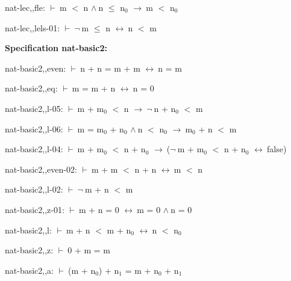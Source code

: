 \documentclass[a4paper]{article}
\newcommand{\Fol}{\mbox{$\vdash\ $}}
\newcommand{\Not}{\mbox{$\neg\ $}}
\newcommand{\And}{\mbox{$\wedge\ $}}
\newcommand{\Imp}{\mbox{$\rightarrow\ $}}
\newcommand{\Equiv}{\mbox{$\leftrightarrow\ $}}
\begin{document}
nat-lec,,fle: 
 \Fol m $<$ n \And n $\le$ $\mbox{n}_{0}$ \Imp m $<$ $\mbox{n}_{0}$



\bigskip

nat-lec,,lels-01: 
 \Fol \Not m $\le$ n \Equiv n $<$ m



\bigskip

{\bf Specification nat-basic2:}

nat-basic2,,even: 
 \Fol n + n = m + m \Equiv n = m



\bigskip

nat-basic2,,eq: 
 \Fol m = m + n \Equiv n = 0



\bigskip

nat-basic2,,l-05: 
 \Fol m + $\mbox{m}_{0}$ $<$ n \Imp \Not n + $\mbox{n}_{0}$ $<$ m



\bigskip

nat-basic2,,l-06: 
 \Fol m = $\mbox{m}_{0}$ + $\mbox{n}_{0}$ \And n $<$ $\mbox{n}_{0}$ \Imp $\mbox{m}_{0}$ + n $<$ m



\bigskip

nat-basic2,,l-04: 
 \Fol m + $\mbox{m}_{0}$ $<$ n + $\mbox{n}_{0}$ \Imp (\Not m + $\mbox{m}_{0}$ $<$ n + $\mbox{n}_{0}$ \Equiv false)



\bigskip

nat-basic2,,even-02: 
 \Fol m + m $<$ n + n \Equiv m $<$ n



\bigskip

nat-basic2,,l-02: 
 \Fol \Not m + n $<$ m



\bigskip

nat-basic2,,z-01: 
 \Fol m + n = 0 \Equiv m = 0 \And n = 0



\bigskip

nat-basic2,,l: 
 \Fol m + n $<$ m + $\mbox{n}_{0}$ \Equiv n $<$ $\mbox{n}_{0}$



\bigskip

nat-basic2,,z: 
 \Fol 0 + m = m



\bigskip

nat-basic2,,a: 
 \Fol (m + $\mbox{n}_{0}$) + $\mbox{n}_{1}$ = m + $\mbox{n}_{0}$ + $\mbox{n}_{1}$
\end{document}

